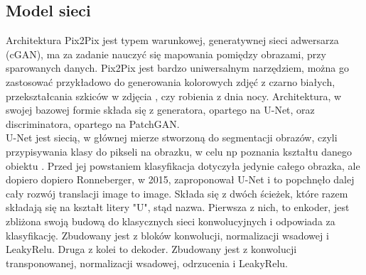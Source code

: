 \documentclass[12pt]{article}
\begin{document}
\begin{sloppypar}
{  \subsection{Model sieci}
  {
    Architektura Pix2Pix jest typem warunkowej, generatywnej sieci adwersarza (cGAN), ma za zadanie nauczyć się mapowania pomiędzy obrazami, przy sparowanych danych.
    Pix2Pix jest bardzo uniwersalnym narzędziem, można go zastosować przykładowo do generowania kolorowych zdjęć z czarno białych, przekształcania szkiców w zdjęcia \cite{pix2pix-tf}, czy robienia z dnia nocy. 
    Architektura, w swojej bazowej formie składa się z generatora, opartego na U-Net, oraz discriminatora, opartego na PatchGAN. \\
    U-Net jest siecią, w głównej mierze stworzoną do segmentacji obrazów, czyli przypisywania klasy do pikseli na obrazku, w celu np poznania kształtu danego obiektu \cite{image-seg}.
    Przed jej powstaniem klasyfikacja dotyczyła jedynie całego obrazka, ale dopiero dopiero Ronneberger, w 2015, zaproponował U-Net i to popchnęło dalej cały rozwój translacji image to image. 
    Składa się z dwóch ścieżek, które razem składają się na kształt litery "U", stąd nazwa. Pierwsza z nich, to enkoder, jest zbliżona swoją budową do klasycznych sieci konwolucyjnych i odpowiada za klasyfikację. 
    Zbudowany jest z bloków konwolucji, normalizacji wsadowej i LeakyRelu. 
    Druga z kolei to dekoder\cite{u-net}. Zbudowany jest z konwolucji transponowanej, normalizacji wsadowej, odrzucenia i LeakyRelu.
    \begin{figure}[H]
      \centering

\end{figure}}}
\end{sloppypar}
\end{document}
